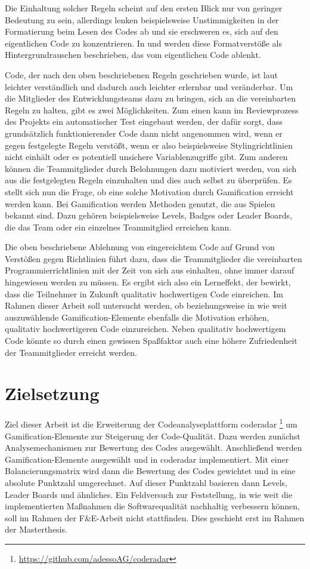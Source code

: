 \documentclass[
	oneside,  %
	ngerman, 
	final, 
	11pt, 
	a4paper, 
	1.1headlines, 
	headinclude=false, 
	footinclude=false, 
	mpinclude=false, 
	pagesize, 
	onecolumn, 
	titlepage, 
	parskip=half, 
	headsepline, 
	chapterprefix=false, 
	version=first, 
	listof=totoc, 
	bibliography=totoc, 
	toc=graduated, 
	fleqn
]{scrbook}
\begin{document}
Die Einhaltung solcher Regeln scheint auf den ersten Blick nur von geringer Bedeutung zu sein, allerdings lenken beispielsweise Unstimmigkeiten in der Formatierung beim Lesen des Codes ab und sie erschweren es, sich auf den eigentlichen Code zu konzentrieren.
In \cite{PJ2015} und \cite{SP2011} werden diese Formatverstöße als Hintergrundrauschen beschrieben, das vom eigentlichen Code ablenkt. 

Code, der nach den oben beschriebenen Regeln geschrieben wurde, ist laut \cite{PJ2015} leichter verständlich und dadurch auch leichter erlernbar und veränderbar.
Um die Mitglieder des Entwicklungsteams dazu zu bringen, sich an die vereinbarten Regeln zu halten, gibt es zwei Möglichkeiten.
Zum einen kann im Reviewprozess des Projekts ein automatischer Test eingebaut werden, der dafür sorgt, dass grundsätzlich funktionierender Code dann nicht angenommen wird, wenn er gegen festgelegte Regeln verstößt, wenn er also beispielsweise Stylingrichtlinien nicht einhält oder es potentiell unsichere Variablenzugriffe gibt.
Zum anderen können die Teammitglieder durch Belohnungen dazu motiviert werden, von sich aus die festgelegten Regeln einzuhalten und dies auch selbst zu überprüfen. 
Es stellt sich nun die Frage, ob eine solche Motivation durch Gamification erreicht werden kann.
Bei Gamification werden Methoden genutzt, die aus Spielen bekannt sind.
Dazu gehören beispielsweise Levels, Badges oder Leader Boards, die das Team oder ein einzelnes Teammitglied erreichen kann. 

Die oben beschriebene Ablehnung von eingereichtem Code auf Grund von Verstößen gegen Richtlinien führt dazu, dass die Teammitglieder die vereinbarten Programmierrichtlinien mit der Zeit von sich aus einhalten, ohne immer darauf hingewiesen werden zu müssen.
Es ergibt sich also ein Lerneffekt, der bewirkt, dass die Teilnehmer in Zukunft qualitativ hochwertigen Code einreichen.
Im Rahmen dieser Arbeit soll untersucht werden, ob beziehungsweise in wie weit auszuwählende Gamification-Elemente ebenfalls die Motivation erhöhen, qualitativ hochwertigeren Code einzureichen.
Neben qualitativ hochwertigem Code könnte so durch einen gewissen \glqq Spaßfaktor\grqq{} auch eine höhere Zufriedenheit der Teammitglieder erreicht werden.
		
\section{Zielsetzung}
\label{Zielsetzung}
Ziel dieser Arbeit ist die Erweiterung der Codeanalyseplattform coderadar \footnote{\url{https://github.com/adessoAG/coderadar}} um Gamification-Elemente zur Steigerung der Code-Qualität.
Dazu werden zunächst Analysemechanismen zur Bewertung des Codes ausgewählt.
Anschließend werden Gamification-Elemente ausgewählt und in coderadar implementiert.
Mit einer Balancierungsmatrix wird dann die Bewertung des Codes gewichtet und in eine absolute Punktzahl umgerechnet.
Auf dieser Punktzahl basieren dann Levels, Leader Boards und ähnliches.
Ein Feldversuch zur Feststellung, in wie weit die implementierten Maßnahmen die Softwarequalität nachhaltig verbessern können, soll im Rahmen der F\&E-Arbeit nicht stattfinden.
Dies geschieht erst im Rahmen der Masterthesis.
		
\end{document}
